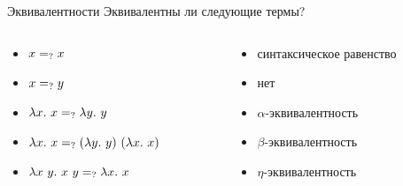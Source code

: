     \begin{frame}[fragile]{Эквивалентности}
        Эквивалентны ли следующие термы?
        \vspace{-1em}
        \begin{columns}[onlytextwidth]
            \begin{column}[t]{0.4\textwidth}
                \begin{itemize}
                    \item[\todo] $x =_{?} x$
                    \item[\todo] $x =_{?} y$
                    \item[\todo] $\lambda x. ~ x =_{?} \lambda y. ~ y$
                    \item[\todo] $\lambda x. ~ x =_{?} (\lambda y. ~ y) ~ (\lambda x. ~ x)$
                    \item[\todo] $\lambda x ~ y. ~ x ~ y =_{?} \lambda x. ~ x$
                \end{itemize}
            \end{column}\hfill%
            \begin{column}[t]{0.485\textwidth}
                \begin{itemize}
                    \item[\answer] \pause синтаксическое равенство
                    \item[\answer] \pause нет
                    \item[\answer] \pause $\alpha$-эквивалентность
                    \item[\answer] \pause $\beta$-эквивалентность
                    \item[\answer] \pause $\eta$-эквивалентность
                \end{itemize}
            \end{column}
        \end{columns}
    \end{frame}


